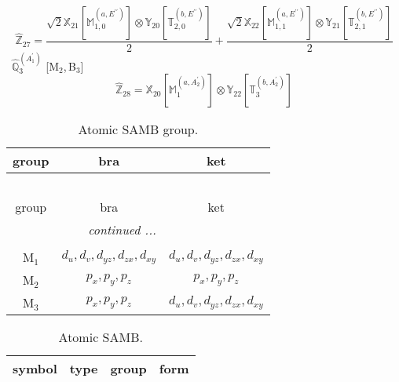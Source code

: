 \documentclass[fleqn,10pt,landscape]{article}
\begin{document}
\begin{itemize}
\begin{dmath*}
\hat{\mathbb{Z}}_{27}=\frac{\sqrt{2} \mathbb{X}_{21}[\mathbb{M}_{1,0}^{(a,E^{\prime\prime})}] \otimes\mathbb{Y}_{20}[\mathbb{T}_{2,0}^{(b,E^{\prime\prime})}]}{2} + \frac{\sqrt{2} \mathbb{X}_{22}[\mathbb{M}_{1,1}^{(a,E^{\prime\prime})}] \otimes\mathbb{Y}_{21}[\mathbb{T}_{2,1}^{(b,E^{\prime\prime})}]}{2}
\end{dmath*}
\vspace{4mm}
\noindent {} $\,\,\,\hat{\mathbb{Q}}_{3}^{(A_{1}^{\prime})}$ [M$_{2}$,\,B$_{3}$]
\begin{dmath*}
\hat{\mathbb{Z}}_{28}=\mathbb{X}_{20}[\mathbb{M}_{1}^{(a,A_{2}^{\prime})}] \otimes\mathbb{Y}_{22}[\mathbb{T}_{3}^{(b,A_{2}^{\prime})}]
\end{dmath*}
\begin{center}
\renewcommand{\arraystretch}{1.3}
\begin{longtable}{c|c|c}
\caption{Atomic SAMB group.}
 \\
 \hline \hline
group & bra & ket \\ \hline \endfirsthead

\multicolumn{2}{l}{\tablename\ \thetable{}} \\
 \hline \hline
group & bra & ket \\ \hline \endhead

 \hline \hline
\multicolumn{2}{r}{\footnotesize\it continued ...} \\ \endfoot

 \hline \hline
\multicolumn{2}{r}{} \\ \endlastfoot

M$_{1}$ & $d_{u}, d_{v}, d_{yz}, d_{zx}, d_{xy}$ & $d_{u}, d_{v}, d_{yz}, d_{zx}, d_{xy}$ \\
M$_{2}$ & $p_{x}, p_{y}, p_{z}$ & $p_{x}, p_{y}, p_{z}$ \\
M$_{3}$ & $p_{x}, p_{y}, p_{z}$ & $d_{u}, d_{v}, d_{yz}, d_{zx}, d_{xy}$ \\
\end{longtable}
\end{center}
\begin{center}
\renewcommand{\arraystretch}{1.3}
\begin{longtable}{c|c|c|c}
\caption{Atomic SAMB.}
 \\
 \hline \hline
symbol & type & group & form \\ \hline \endfirsthead


\end{longtable}
\end{center}
\end{itemize}
\end{document}
